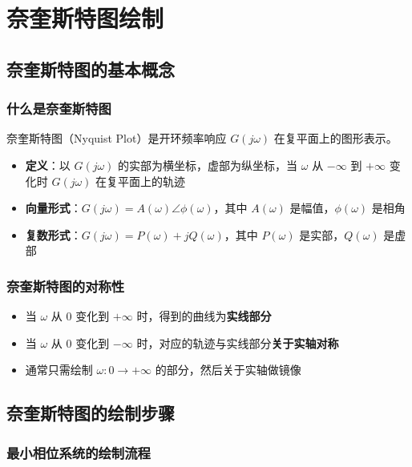 \section{奈奎斯特图绘制}

\subsection{奈奎斯特图的基本概念}

\subsubsection{什么是奈奎斯特图}
奈奎斯特图（Nyquist Plot）是开环频率响应 $G(j\omega)$ 在复平面上的图形表示。

\begin{itemize}
    \item \textbf{定义}：以 $G(j\omega)$ 的实部为横坐标，虚部为纵坐标，当 $\omega$ 从 $-\infty$ 到 $+\infty$ 变化时 $G(j\omega)$ 在复平面上的轨迹
    \item \textbf{向量形式}：$G(j\omega) = A(\omega)\angle\phi(\omega)$，其中 $A(\omega)$ 是幅值，$\phi(\omega)$ 是相角
    \item \textbf{复数形式}：$G(j\omega) = P(\omega) + jQ(\omega)$，其中 $P(\omega)$ 是实部，$Q(\omega)$ 是虚部
\end{itemize}

\subsubsection{奈奎斯特图的对称性}
\begin{itemize}
    \item 当 $\omega$ 从 $0$ 变化到 $+\infty$ 时，得到的曲线为\textbf{实线部分}
    \item 当 $\omega$ 从 $0$ 变化到 $-\infty$ 时，对应的轨迹与实线部分\textbf{关于实轴对称}
    \item 通常只需绘制 $\omega: 0 \to +\infty$ 的部分，然后关于实轴做镜像
\end{itemize}

\subsection{奈奎斯特图的绘制步骤}

\subsubsection{最小相位系统的绘制流程}


